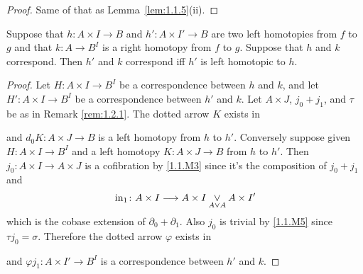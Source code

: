 \documentclass[../main]{subfiles}
\begin{document}
\begin{proof}
Same of that as Lemma~\ref{lem:1.1.5}(ii).
\end{proof}

\begin{lemma}
    \label{lem:1.2.2}
    Suppose that $h \colon A \times I \longrightarrow B$ and $h' \colon A \times I' \longrightarrow B$ are two left homotopies from $f$ to $g$ and that $k \colon A \longrightarrow B^I$ is a right homotopy from $f$ to $g$. Suppose that $h$ and $k$ correspond. Then $h'$ and $k$ correspond iff $h'$ is left homotopic to $h$.
\end{lemma}

\begin{proof}
    Let $H \colon A \times I \longrightarrow B^I$ be a correspondence between $h$ and $k$, and let $H' \colon A \times I \longrightarrow B^I$ be a correspondence between $h'$ and $k$. Let $A \times J$, $j_0 + j_1$, and $\tau$ be as in Remark \ref{rem:1.2.1}. The dotted arrow $K$ exists in 
    \begin{center}
    \end{center}
    and $d_0 K \colon A \times J \longrightarrow B$ is a left homotopy from $h$ to $h'$. Conversely suppose given $H \colon A \times I \longrightarrow B^I$ and a left homotopy $K \colon A \times J \longrightarrow B$ from $h$ to $h'$. Then $j_0 \colon A \times I \longrightarrow A \times J$ is a cofibration by \ref{1.1.M3} since it's the composition of $j_0 + j_1$ and \[\operatorname{in}_{1} \colon A \times I \longrightarrow A \times I \underset{A \vee A}{\vee} A \times I'\] which is the cobase extension of $\partial_0 + \partial_1$. Also $j_0$ is trivial by \ref{1.1.M5} since $\tau j_0 = \sigma$. Therefore the dotted arrow $\varphi$ exists in 
    \begin{center}
    \end{center}
    and $\varphi j_1 \colon A \times I' \longrightarrow B^I$ is a correspondence between $h'$ and $k$.
\end{proof}
\end{document}
